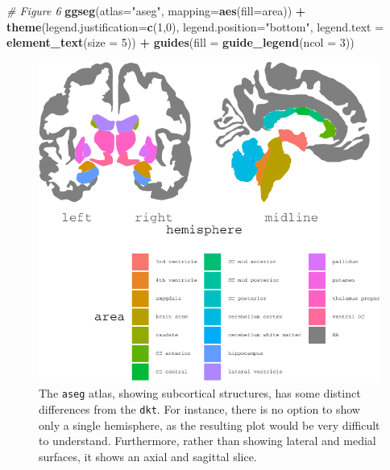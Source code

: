 \documentclass[fleqn,10pt]{wlpeerj} %
\newenvironment{Shaded}{\begin{snugshade}}{\end{snugshade}}
\newcommand{\CommentTok}[1]{\textcolor[rgb]{0.56,0.35,0.01}{\textit{#1}}}
\newcommand{\DataTypeTok}[1]{\textcolor[rgb]{0.13,0.29,0.53}{#1}}
\newcommand{\DecValTok}[1]{\textcolor[rgb]{0.00,0.00,0.81}{#1}}
\newcommand{\KeywordTok}[1]{\textcolor[rgb]{0.13,0.29,0.53}{\textbf{#1}}}
\newcommand{\NormalTok}[1]{#1}
\newcommand{\OperatorTok}[1]{\textcolor[rgb]{0.81,0.36,0.00}{\textbf{#1}}}
\newcommand{\StringTok}[1]{\textcolor[rgb]{0.31,0.60,0.02}{#1}}
\begin{document}
\begin{Shaded}
\begin{Highlighting}[]
\CommentTok{\# Figure 6}
\KeywordTok{ggseg}\NormalTok{(}\DataTypeTok{atlas=}\StringTok{"aseg"}\NormalTok{, }\DataTypeTok{mapping=}\KeywordTok{aes}\NormalTok{(}\DataTypeTok{fill=}\NormalTok{area)) }\OperatorTok{+}\StringTok{ }
\StringTok{  }\KeywordTok{theme}\NormalTok{(}\DataTypeTok{legend.justification=}\KeywordTok{c}\NormalTok{(}\DecValTok{1}\NormalTok{,}\DecValTok{0}\NormalTok{),}
        \DataTypeTok{legend.position=}\StringTok{"bottom"}\NormalTok{,}
        \DataTypeTok{legend.text =} \KeywordTok{element\_text}\NormalTok{(}\DataTypeTok{size =} \DecValTok{5}\NormalTok{)) }\OperatorTok{+}
\StringTok{  }\KeywordTok{guides}\NormalTok{(}\DataTypeTok{fill =} \KeywordTok{guide\_legend}\NormalTok{(}\DataTypeTok{ncol =} \DecValTok{3}\NormalTok{))}
\end{Highlighting}
\end{Shaded}

\begin{figure}
\centering
\includegraphics{draft_2_files/figure-latex/atlases-1.pdf}
\caption{\label{fig:atlases}The \texttt{aseg} atlas, showing subcortical structures, has some distinct differences from the \texttt{dkt}. For instance, there is no option to show only a single hemisphere, as the resulting plot would be very difficult to understand. Furthermore, rather than showing lateral and medial surfaces, it shows an axial and sagittal slice.}
\end{figure}
\end{document}
